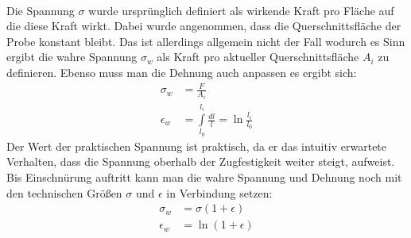 \documentclass[11pt,a4paper]{article}
\numberwithin{equation}{section}
\numberwithin{figure}{section}
\begin{document}
\\
\begin{addmargin}[25pt]{0pt}
Die Spannung $\sigma$ wurde ursprünglich definiert als wirkende Kraft pro Fläche auf die diese Kraft wirkt. Dabei wurde angenommen, dass die Querschnittsfläche der Probe konstant bleibt. Das ist allerdings allgemein nicht der Fall wodurch es Sinn ergibt die wahre Spannung $\sigma_w$ als Kraft pro aktueller Querschnittsfläche $A_i$ zu definieren. Ebenso muss man die Dehnung auch anpassen es ergibt sich: 
\begin{align}\label{eq:wahre_Spannung}
    \sigma_w &= \frac{F}{A_i}\\\label{eq:wahre_Dehnung}
    \epsilon_w &= \int\limits_{l_0}^{l_i} \frac{\si{d}l}{l} = \ln \frac{l_i}{l_0}
\end{align}
Der Wert der praktischen Spannung ist praktisch, da er das intuitiv erwartete Verhalten, dass die Spannung oberhalb der Zugfestigkeit weiter steigt, aufweist. Bis Einschnürung auftritt kann man die wahre Spannung und Dehnung noch mit den technischen Größen $\sigma$ und $\epsilon$ in Verbindung setzen:
\begin{align}\label{eq:wahre_Spannung_mit_technischen_Größen}
    \sigma_w &= \sigma(1+\epsilon)\\ \label{eq:wahre_Dehnung_mit_technischen_Größen}
    \epsilon_w &= \ln (1+\epsilon)
\end{align}
\end{addmargin}
\end{document}
